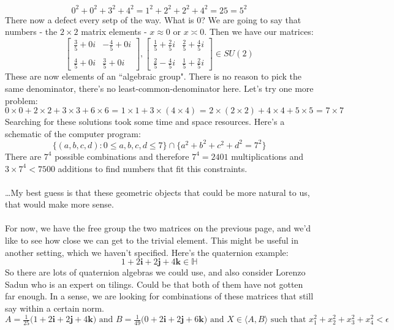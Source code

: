 \documentclass[12pt]{article}
\begin{document}
$$ 0^2 + 0^2 + 3^2 + 4^2 = 1^2 + 2^2 + 2^2 + 4^2 = 25 = 5^2 $$
There now a defect every setp of the way.  What is $0$?  We are going to say that numbers - the $2 \times 2$ matrix elements - $x \approx 0$ or $x \asymp 0$.  Then we have our matrices:
$$ 
\left[ \begin{array}{rr} \frac{3}{5} +0i& - \frac{4}{5}+0i\\ \\ \frac{4}{5}+0i & \frac{3}{5}+0i\end{array} \right] , 
\left[ \begin{array}{rr}  \frac{1}{5} + \frac{2}{5}i & \frac{2}{5} + \frac{4}{5}i\\ \\ 
\frac{2}{5} - \frac{4}{5}i & \frac{1}{5} + \frac{2}{5}i  \end{array} \right]  \in SU(2) $$
These are now elements of an ``algebraic group". There is no reason to pick the same denominator, there's no least-common-denominator here.  Let's try one more problem:
$$ 0 \times 0 +  2 \times 2 + 3 \times 3 +  6  \times 6 \textbf{ = } 
1 \times 1 + 3\times (4 \times 4)  \textbf{ = } 2 \times (2 \times 2) + 4 \times 4 + 5 \times 5 \textbf{ = } 7 \times 7 $$
Searching for these solutions took some time and space resources.  Here's a schematic of the computer program:
$$ \{ (a,b,c,d) : 0 \leq a ,b,c,d \leq 7 \} \cap \{ a^2 + b^2 + c^2 + d^2 = 7^2\} $$
There are $7^4$ possible combinations and therefore $ 7^4 = 2401$ multiplications and $3 \times 7^4 < 7500$ additions to find numbers that fit this constraints.  \\ \\
\dots My best guess is that these geometric objects that could be more natural to us, that would make more sense. \\ \\
For now, we have the free group the two matrices on the previous page, and we'd like to see how close we can get to the trivial element.  This might be useful in another setting, which we haven't specified.  Here's the quaternion example:  
$$ 1 + 2 \mathbf{i} + 2 \mathbf{j} + 4 \mathbf{k} \in \mathbb{H} $$
So there are lots of quaternion algebras we could use, and also consider Lorenzo Sadun who is an expert on tilings.  Could be that both of them have not gotten far enough.  In a sense, we are looking for combinations of these matrices that still say within a certain norm.
$$ A = \tfrac{1}{25}\big(1 + 2 \mathbf{i} + 2 \mathbf{j} + 4 \mathbf{k}\big) \text{ and }
B = \tfrac{1}{49} \big( 0 + 2\mathbf{i} + 2 \mathbf{j} + 6 \mathbf{k}\big)  \text{ and }X \in \langle A,B\rangle \text{ such that } x_1^2 + x_2^2 + x_3^2 + x_4^2 < \epsilon $$
\end{document}

